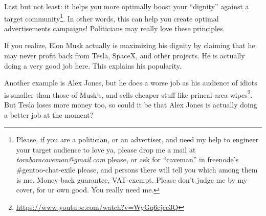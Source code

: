\documentclass{report}
\begin{document}
Last but not least: it helps you more optimally boost your ``dignity'' against a
target community\footnote{Please, if you are a politician, or an advertiser,
and need my help to engineer your target audience to love ya, please drop me a
mail at \emph{toraboracaveman@gmail.com} please, or ask for ``caveman'' in
freenode's \#gentoo-chat-exile please, and persons there will tell you which
among them is me. Money-back guarantee, VAT-exempt. Please don't judge me by my cover, for
ur own good. You really need me.}. In other words, this can help you create
optimal advertisements campaigns! Politicians may really love these principles.

If you realize, Elon Musk actually is maximizing his dignity by claiming that
he may never profit back from Tesla, SpaceX, and other projects.  He is
actually doing a very good job here. This explains his popularity.

Another example is Alex Jones, but he does a worse job as his audience of
idiots is smaller than those of Musk's, and sells cheaper stuff like
prineal-area wipes\footnote{\url{https://www.youtube.com/watch?v=WyGq6cjcc3Q}}.
But Tesla loses more money too, so could it be that Alex Jones is actually
doing a better job at the moment?
\end{document}
